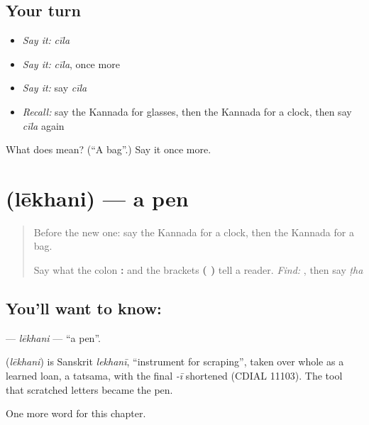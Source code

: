 \subsection*{Your turn}
\begin{itemize}
\raggedright
  \item \emph{Say it:} \emph{cīla}
  \item \emph{Say it:} \emph{cīla}, once more
  \item \emph{Say it:} say \emph{cīla}
  \item \emph{Recall:} say the Kannada for glasses, then the Kannada for a clock, then say \emph{cīla} again
\end{itemize}

\begin{tcolorbox}[breakable,colback=teal!4,colframe=teal!35!black,title={Before you move on}]
What does  mean? (\textquotedblleft{}A bag\textquotedblright{}.) Say it once more.
\end{tcolorbox}
\section[\texorpdfstring{\kn{ಲೇಖನಿ} (lēkhani)}{ಲೇಖನಿ (lēkhani)}]{ (lēkhani) — a pen}

\label{lesson:KA-C118-lekhani}



\begin{quote}
Before the new one: say the Kannada for a clock, then the Kannada for a bag.

Say what the colon \textbf{:} and the brackets \textbf{( )} tell a reader. \emph{Find:} \textbf{}, then say \emph{ṭha}
\end{quote}

\subsection*{You'll want to know: }
\textbf{} — \emph{lēkhani} — \textquotedblleft{}a pen\textquotedblright{}.

\begin{cousinweb}
\textbf{} (\emph{lēkhani}) is Sanskrit \emph{lekhanī}, \textquotedblleft{}instrument for scraping\textquotedblright{}, taken over whole as a learned loan, a tatsama, with the final \emph{-ī} shortened (CDIAL 11103). The tool that scratched letters became the pen.
\end{cousinweb}

\begin{grammarlens}[title={What you've built}]
One more word for this chapter.
\end{grammarlens}

